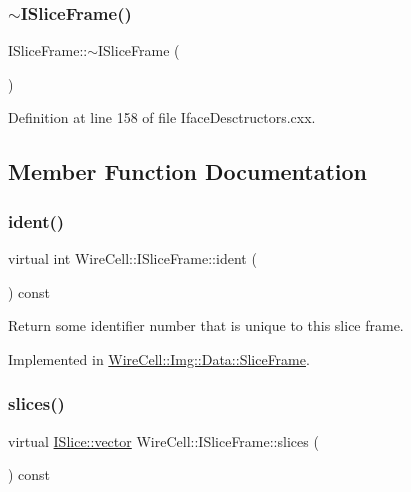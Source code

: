 \subsubsection{\texorpdfstring{$\sim$\+I\+Slice\+Frame()}{~ISliceFrame()}}
{\footnotesize\ttfamily I\+Slice\+Frame\+::$\sim$\+I\+Slice\+Frame (\begin{DoxyParamCaption}{ }\end{DoxyParamCaption})\hspace{0.3cm}{\ttfamily [virtual]}}



Definition at line 158 of file Iface\+Desctructors.\+cxx.



\subsection{Member Function Documentation}
\mbox{\label{class_wire_cell_1_1_i_slice_frame_a225275e1508b1002f71727f07d802dba}} 
\subsubsection{\texorpdfstring{ident()}{ident()}}
{\footnotesize\ttfamily virtual int Wire\+Cell\+::\+I\+Slice\+Frame\+::ident (\begin{DoxyParamCaption}{ }\end{DoxyParamCaption}) const\hspace{0.3cm}{\ttfamily [pure virtual]}}



Return some identifier number that is unique to this slice frame. 



Implemented in \hyperlink{class_wire_cell_1_1_img_1_1_data_1_1_slice_frame_a958796aa5c7faa7b6a2195d30a4b5f2a}{Wire\+Cell\+::\+Img\+::\+Data\+::\+Slice\+Frame}.

\mbox{\label{class_wire_cell_1_1_i_slice_frame_ad3aa9394b6202e3ea4fbd30dbcc1ba2a}} 
\subsubsection{\texorpdfstring{slices()}{slices()}}
{\footnotesize\ttfamily virtual \hyperlink{class_wire_cell_1_1_i_data_ae1a9f863380499bb43f39fabb6276660}{I\+Slice\+::vector} Wire\+Cell\+::\+I\+Slice\+Frame\+::slices (\begin{DoxyParamCaption}{ }\end{DoxyParamCaption}) const\hspace{0.3cm}{\ttfamily [pure virtual]}}



